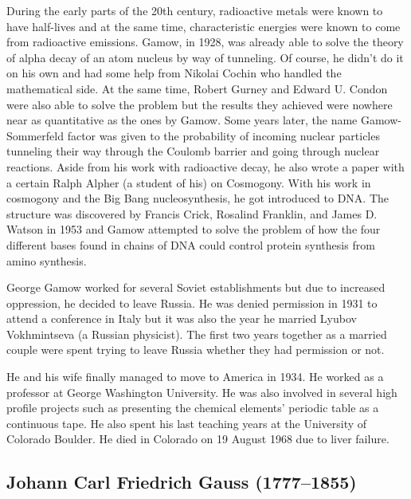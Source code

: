 During the early parts of the 20th century, radioactive metals were known to have half-lives and at the same time, characteristic energies were known to come from radioactive emissions. Gamow, in 1928, was already able to solve the theory of alpha decay of an atom nucleus by way of tunneling. Of course, he didn’t do it on his own and had some help from Nikolai Cochin who handled the mathematical side. At the same time, Robert Gurney and Edward U. Condon were also able to solve the problem but the results they achieved were nowhere near as quantitative as the ones by Gamow. Some years later, the name Gamow-Sommerfeld factor was given to the probability of incoming nuclear particles tunneling their way through the Coulomb barrier and going through nuclear reactions. Aside from his work with radioactive decay, he also wrote a paper with a certain Ralph Alpher (a student of his) on Cosmogony. With his work in cosmogony and the Big Bang nucleosynthesis, he got introduced to DNA. The structure was discovered by Francis Crick, Rosalind Franklin, and James D. Watson in 1953 and Gamow attempted to solve the problem of how the four different bases found in chains of DNA could control protein synthesis from amino synthesis.

George Gamow worked for several Soviet establishments but due to increased oppression, he decided to leave Russia. He was denied permission in 1931 to attend a conference in Italy but it was also the year he married Lyubov Vokhmintseva (a Russian physicist). The first two years together as a married couple were spent trying to leave Russia whether they had permission or not.

He and his wife finally managed to move to America in 1934. He worked as a professor at George Washington University. He was also involved in several high profile projects such as presenting the chemical elements’ periodic table as a continuous tape. He also spent his last teaching years at the University of Colorado Boulder. He died in Colorado on 19 August 1968 due to liver failure.

\subsection[Carl \scshape{Gauss}]{Johann Carl Friedrich Gauss (1777--1855)}\label{bio:gauss}

